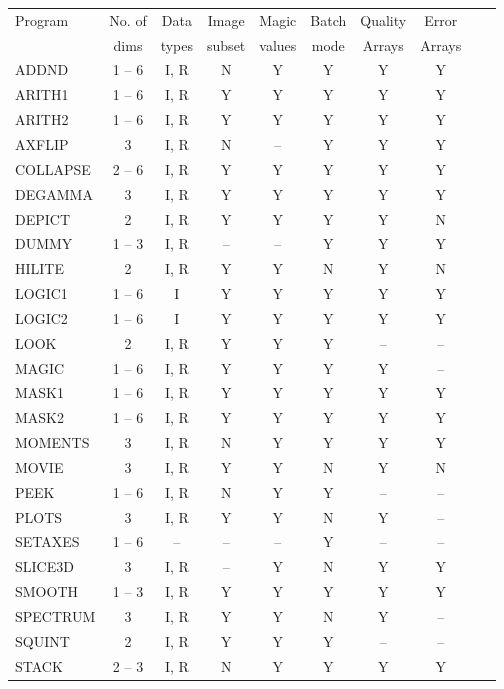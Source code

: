 {\small
\begin{table}[ht]
\begin{center}
\begin{tabular}{|l|c|c|c|c|c|c|c|c|c|} \hline
Program & No. of & Data  & Image  & Magic  & Batch & Quality & Error \\
        & dims   & types & subset & values & mode  & Arrays & Arrays\\
\hline
ADDND     & 1 -- 6 & I, R & N & Y & Y & Y & Y\\
ARITH1    & 1 -- 6 & I, R & Y & Y & Y & Y & Y\\
ARITH2    & 1 -- 6 & I, R & Y & Y & Y & Y & Y\\
AXFLIP    & 3      & I, R & N & -- & Y & Y & Y\\
COLLAPSE  & 2 -- 6 & I, R & Y & Y & Y & Y & Y\\
DEGAMMA   & 3      & I, R & Y & Y & Y & Y & Y\\
DEPICT    & 2      & I, R & Y & Y & Y & Y & N\\
DUMMY     & 1 -- 3 & I, R & -- & -- & Y & Y & Y\\
HILITE    & 2      & I, R & Y & Y & N & Y & N\\
LOGIC1    & 1 -- 6 & I    & Y & Y & Y & Y & Y\\
LOGIC2    & 1 -- 6 & I    & Y & Y & Y & Y & Y\\
LOOK      & 2      & I, R & Y & Y & Y & -- & --\\
MAGIC     & 1 -- 6 & I, R & Y & Y & Y & Y & --\\
MASK1     & 1 -- 6 & I, R & Y & Y & Y & Y & Y\\
MASK2     & 1 -- 6 & I, R & Y & Y & Y & Y & Y\\
MOMENTS   & 3      & I, R & N & Y & Y & Y & Y\\
MOVIE     & 3      & I, R & Y & Y & N & Y & N\\
PEEK      & 1 -- 6 & I, R & N & Y & Y & -- & --\\
PLOTS     & 3      & I, R & Y & Y & N & Y & --\\
SETAXES   & 1 -- 6 & --   & -- & -- & Y & -- & --\\
SLICE3D   & 3      & I, R & -- & Y & N & Y & Y\\
SMOOTH    & 1 -- 3 & I, R & Y & Y & Y & Y & Y\\
SPECTRUM  & 3      & I, R & Y & Y & N & Y & --\\
SQUINT    & 2      & I, R & Y & Y & Y & -- & --\\
STACK     & 2 -- 3 & I, R & N & Y & Y & Y & Y\\

\end{tabular}
\end{center}
\end{table}}

